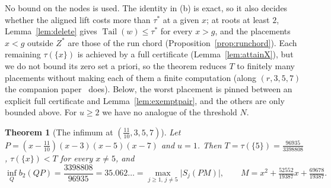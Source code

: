 \documentclass[11pt]{article}
\newtheorem{theorem}{Theorem}[section]
\theoremstyle{definition}
\theoremstyle{plain}
\DeclareMathOperator{\Tail}{Tail}
\begin{document}
No bound on the nodes is used.  The identity in (b) is exact, so it also
decides whether the aligned lift costs more than $\tau^*$ at a given $x$;
at roots at least $2$, Lemma~\ref{lem:delete} gives $\Tail(w)\le\tau^*$ for
every $x>g$, and the placements $x<g$ outside $Z^*$ are those of the run
chord (Proposition~\ref{prop:runchord}).  Each remaining $\tau(\{x\})$ is
achieved by a full certificate (Lemma~\ref{lem:attainX}), but we do not
bound its zero set a priori, so the theorem reduces $T$ to finitely many
placements without making each of them a finite computation (along
$(r,3,5,7)$ the companion paper~\cite{coefficient-mass-family} does).  Below, the
worst placement is pinned between an explicit full certificate and
Lemma~\ref{lem:exemptpair}, and the others are only bounded above.  For
$u\ge2$ we have no analogue of the threshold $N$.

\begin{theorem}[The infimum at $(\tfrac{11}{10},3,5,7)$]\label{thm:elevenvalue}
Let $P=(x-\tfrac{11}{10})(x-3)(x-5)(x-7)$ and $u=1$.  Then
$T=\tau(\{5\})=\tfrac{96935}{3398808}$, $\tau(\{x\})<T$ for every $x\ne5$,
and
\[
  \inf_Qb_2(QP)=\frac{3398808}{96935}=35.062\ldots
  =\max_{j\ge1,\,j\ne5}\bigl|S_j(PM)\bigr|,\qquad
  M=x^2+\tfrac{52552}{19387}x+\tfrac{69678}{19387}.
\]
\end{theorem}
\end{document}
